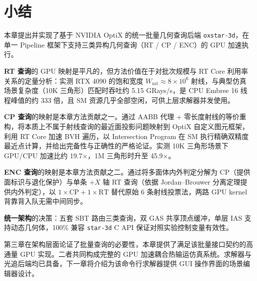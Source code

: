 \section{小结}
\label{sec:optix_backend:conclusion}

本章提出并实现了基于 NVIDIA OptiX 的统一批量几何查询后端 \texttt{oxstar-3d}，在单一 Pipeline 框架下支持三类异构几何查询（RT / CP / ENC）的 GPU 加速执行。

\textbf{RT 查询}的 GPU 映射是平凡的，但方法价值在于对批次规模与 RT Core 利用率关系的定量分析：实测 RTX 4090 的饱和宽度 $W_{\text{sat}} \approx 8 \times 10^6$ 射线，与典型仿真场景复杂度（10K 三角形）匹配时吞吐约 5.15 GRays/s，是 CPU Embree 16 线程峰值的约 333 倍，且 SM 资源几乎全部空闲，可供上层求解器并发使用。

\textbf{CP 查询}的映射是本章方法贡献之一。通过 AABB 代理 + 零长度射线的等价重构，将本质上不属于射线查询的最近面投影问题映射到 OptiX 自定义图元框架，利用 RT Core 加速 BVH 遍历，以 Intersection Program 在 SM 执行精确双精度最近点计算，并给出完备性与正确性的严格论证。实测 10K 三角形场景下 GPU/CPU 加速比约 19.7×，1M 三角形时升至 45.9×。

\textbf{ENC 查询}的映射是本章方法贡献之二。通过将多面体内外判定分解为 CP（提供面标识与退化保护）与单条 $+X$ 轴 RT 查询（依据 Jordan–Brouwer 分离定理提供内外判定），以 $1 \times \text{CP} + 1 \times \text{RT}$ 替代原始 6 条射线投票法，两路 GPU kernel 背靠背入队无需中间同步。

\textbf{统一架构}的决策：五套 SBT 路由三类查询，双 GAS 共享顶点缓冲，单层 IAS 支持动态几何体，100\% 兼容 \texttt{star-3d} C API 保证对照实验控制变量有效性。

第三章在架构层面论证了批量查询的必要性，本章提供了满足该批量接口契约的高通量 GPU 实现。二者共同构成完整的 GPU 加速耦合热输运仿真系统。求解器与光追后端均已具备，下一章将介绍为该命令行求解器提供 GUI 操作界面的场景编辑器设计。
